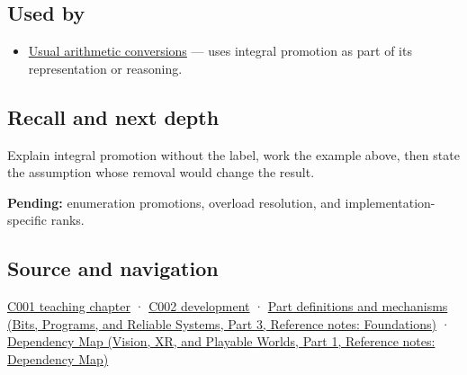 \subsection{Used by}\label{appendix-45303d03796a-used-by}

\hypertarget{appendix-45303d03796a-used-by}{}

\begin{itemize}
\tightlist
\item
  \hyperref[appendix-5e2d663adf7f]{Usual arithmetic conversions} --- uses integral promotion as part of its representation or reasoning.
\end{itemize}

\subsection{Recall and next depth}\label{appendix-45303d03796a-recall-and-next-depth}

\hypertarget{appendix-45303d03796a-recall-and-next-depth}{}

Explain integral promotion without the label, work the example above, then state the assumption whose removal would change the result.

\textbf{Pending:} enumeration promotions, overload resolution, and implementation-specific ranks.

\subsection{Source and navigation}\label{appendix-45303d03796a-source-and-navigation}

\hypertarget{appendix-45303d03796a-source-and-navigation}{}

\hyperref[01-foundations-i-ch001-from-a-signal-to-an-interpretation]{C001 teaching chapter} · \hyperref[01-foundations-i-ch001-arithmetic-becomes-a-policy]{C002 development} · \href{../01-Bits-Programs-and-Reliable-Systems-P03/main.pdf\#nameddest=appendix-fd090d982a15}{Part definitions and mechanisms (Bits, Programs, and Reliable Systems, Part 3, Reference notes: Foundations)} · \href{../07-Vision-XR-and-Playable-Worlds-P01/main.pdf\#nameddest=appendix-4ad47bdd269a}{Dependency Map (Vision, XR, and Playable Worlds, Part 1, Reference notes: Dependency Map)}
